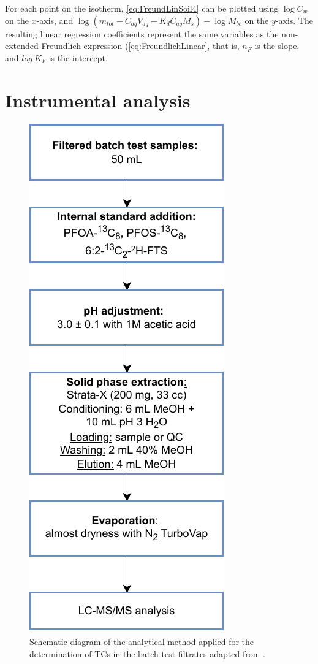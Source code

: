For each point on the isotherm, \cref{eq:FreundLinSoil4} can be plotted using $\log C_{w}$ on the $x$-axis, and $\log (m_{tot} - C_{aq}V_{aq} - K_dC_{aq}M_s) - \log M_{bc}$ on the $y$-axis. The resulting linear regression coefficients represent the same variables as the non-extended Freundlich expression (\cref{eq:FreundlichLinear}, that is, $n_F$ is the slope, and $log~K_F$ is the intercept. 


\section{Instrumental analysis} \label{methods:instrAnalysis}

\begin{figure}
    \centering
    \includegraphics{Diagrams/Methods-Analytical_method.pdf}
    \caption{Schematic diagram of the analytical method applied for the determination of TCs in the batch test filtrates adapted from \cite{arvaniti2012diagram}.}
    \label{fig:analyticalMethod}
\end{figure}

